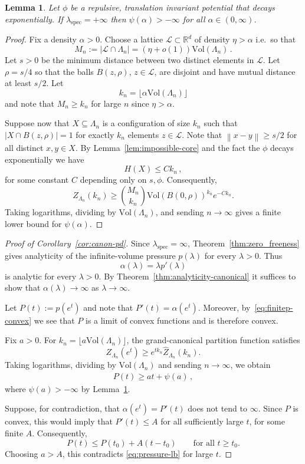 \documentclass[10pt]{amsart}
\newtheorem{lemma}[theorem]{Lemma}
\theoremstyle{definition}
\theoremstyle{remark}
\newcommand{\spec}{{\mathrm{spec}}}
\newcommand{\R}{\mathbb{R}}
\newcommand{\vol}{\mathrm{Vol}}
\newcommand{\norm}[1]{\left\lVert#1\right\rVert}
\begin{document}
	\begin{lemma}\label{lem:psi-finite}
		Let $\phi$ be a repulsive, translation invariant potential that decays exponentially. If $\lambda_\spec=+\infty$ then $\psi(\alpha)>-\infty$ for all $\alpha\in (0,\infty)$.
	\end{lemma}
	\begin{proof}
		Fix a density $\alpha>0$.  Choose a lattice $\mathcal L\subset\R^d$ of
		density $\eta>\alpha$ i.e.\ so that 
		\[
		M_n:=|\mathcal L \cap \Lambda_n|= (\eta +o(1)) \vol(\Lambda_n)\, .
		\]
		Let $s>0$ be the minimum distance between two distinct elements in $\mathcal L$. Let $\rho=s/4$ so that the balls $B(z,\rho)$, $z\in\mathcal L$, are disjoint and have mutual distance at least $s/2$. 
		Let
		\[
		k_n=\lfloor \alpha\vol(\Lambda_n)\rfloor 
		\]
		and note that $M_n\ge k_n$ for large $n$ since $\eta>\alpha$.
		
		Suppose now that $X\subseteq \Lambda_n$ is a configuration of size $k_n$ such that $|X\cap B(z,\rho)|=1$ for exactly $k_n$ elements $z\in \mathcal L$. Note that $\norm{x-y}\geq s/2$ for all distinct $x,y\in X$. 
		By Lemma~\ref{lem:impossible-core} and the fact the $\phi$ decays exponentially we have 
		\[
		H(X)\leq C k_n\, ,
		\]
		for some constant $C$ depending only on $s,\phi$.
		Consequently,
		\[
		\widehat Z_{\Lambda_n}(k_n)
		\ge
		\binom{M_n}{k_n}
		\vol(B(0,\rho))^{k_n}
		e^{-Ck_n}.
		\]
		Taking logarithms, dividing by $\vol(\Lambda_n)$, and sending $n\to\infty$
		gives a finite lower bound for $\psi(\alpha)$.  
	\end{proof}
	
	\begin{proof}[Proof of Corollary~\ref{cor:canon-pd}]
		Since $\lambda_{\spec}=\infty$, Theorem~\ref{thm:zero_freeness} gives
		analyticity of the infinite-volume pressure $p(\lambda)$ for every
		$\lambda>0$. Thus
		\[
		\alpha(\lambda)
		=
		\lambda p'(\lambda)
		\]
		is analytic for every $\lambda>0$.
		By Theorem~\ref{thm:analyticity-canonical} it suffices to show that 
		$\alpha(\lambda)\to\infty$ as $\lambda\to\infty$.
		
		Let $P(t):=p(e^t)$ and note that $P'(t)=\alpha(e^t)$. Moreover, by~\eqref{eq:finitep-convex} we see that $P$ is a limit of convex functions and is therefore convex.
		
		
		Fix $a>0$.  For $k_n=\lfloor a\vol(\Lambda_n)\rfloor$, the
		grand-canonical partition function satisfies
		\[
		Z_{\Lambda_n}(e^t)
		\ge
		e^{t k_n}\widehat Z_{\Lambda_n}(k_n).
		\]
		Taking logarithms, dividing by $\vol(\Lambda_n)$ and sending $n\to\infty$, we obtain
		\begin{align}\label{eq:pressure-lb}
			P(t)
			\ge
			at+\psi(a)\, ,
		\end{align}
		where $\psi(a)>-\infty$
		by Lemma~\ref{lem:psi-finite}.
		
		Suppose, for contradiction, that $\alpha(e^t)=P'(t)$ does not tend to
		$\infty$.  Since $P$ is convex, this would imply that $P'(t)\le A$ for all sufficiently large $t$, for
		some finite $A$.  Consequently,
		\[
		P(t)\le P(t_0)+A(t-t_0)
		\qquad
		\text{for all }t\ge t_0.
		\]
		Choosing $a>A$, this contradicts
		\eqref{eq:pressure-lb} for large $t$.
	\end{proof}
	
\end{document}
